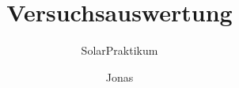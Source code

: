 
\title{Versuchsauswertung}
\subtitle{SolarPraktikum}
\author{Jonas}

\pagestyle{empty} %
\setcounter{page}{0} %
\maketitle %


\newpage 

